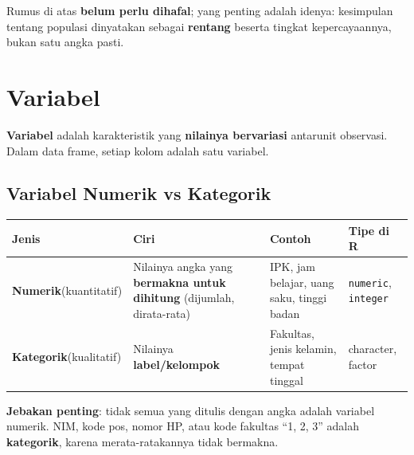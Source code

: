 \documentclass[
  indonesian,
  letterpaper,
]{book}
\newcounter{none} %
\begin{document}
Rumus di atas \textbf{belum perlu dihafal}; yang penting adalah idenya:
kesimpulan tentang populasi dinyatakan sebagai \textbf{rentang} beserta
tingkat kepercayaannya, bukan satu angka pasti.

\section{Variabel}\label{variabel}

\textbf{Variabel} adalah karakteristik yang \textbf{nilainya bervariasi}
antarunit observasi. Dalam data frame, setiap kolom adalah satu
variabel.

\subsection{Variabel Numerik vs
Kategorik}\label{variabel-numerik-vs-kategorik}

{\def\LTcaptype{none} %
\begin{longtable}[]{@{}
  >{\raggedright\arraybackslash}p{}
  >{\raggedright\arraybackslash}p{}
  >{\raggedright\arraybackslash}p{}
  >{\raggedright\arraybackslash}p{}@{}}
\toprule\noalign{}
\begin{minipage}[b]{\linewidth}\raggedright
Jenis
\end{minipage} & \begin{minipage}[b]{\linewidth}\raggedright
Ciri
\end{minipage} & \begin{minipage}[b]{\linewidth}\raggedright
Contoh
\end{minipage} & \begin{minipage}[b]{\linewidth}\raggedright
Tipe di R
\end{minipage} \\
\midrule\noalign{}
\endhead
\bottomrule\noalign{}
\endlastfoot
\textbf{Numerik}(kuantitatif) & Nilainya angka yang \textbf{bermakna
untuk dihitung} (dijumlah, dirata-rata) & IPK, jam belajar, uang saku,
tinggi badan & \texttt{numeric}, \texttt{integer} \\
\textbf{Kategorik}(kualitatif) & Nilainya \textbf{label/kelompok} &
Fakultas, jenis kelamin, tempat tinggal & character, factor \\
\end{longtable}
}

\textbf{Jebakan penting}: tidak semua yang ditulis dengan angka adalah
variabel numerik. NIM, kode pos, nomor HP, atau kode fakultas ``1, 2,
3'' adalah \textbf{kategorik}, karena merata-ratakannya tidak bermakna.
\end{document}
